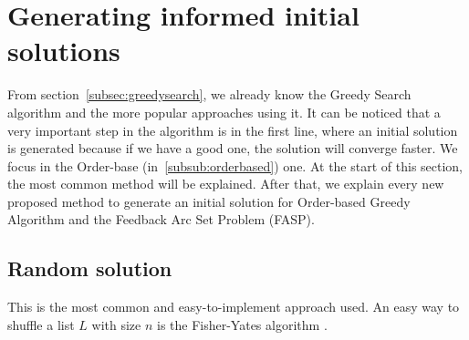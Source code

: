 \section{Generating informed initial solutions}
\label{sec:improve}

From section~\ref{subsec:greedysearch}, we already know the Greedy Search algorithm and the more popular approaches using it. It can be noticed that a very important step in the algorithm is in the first line, where an initial solution is generated because if we have a good one, the solution will converge faster. We focus in the Order-base (in~\ref{subsub:orderbased}) one. At the start of this section, the most common method will be explained. After that, we explain every new proposed method to generate an initial solution for Order-based Greedy Algorithm and the Feedback Arc Set Problem (FASP).

\subsection{Random solution}
\label{subsec:randomapproach}
	This is the most common and easy-to-implement approach used. An easy way to shuffle a list $L$ with size $n$ is the Fisher-Yates algorithm \cite{FisherYates98}.

